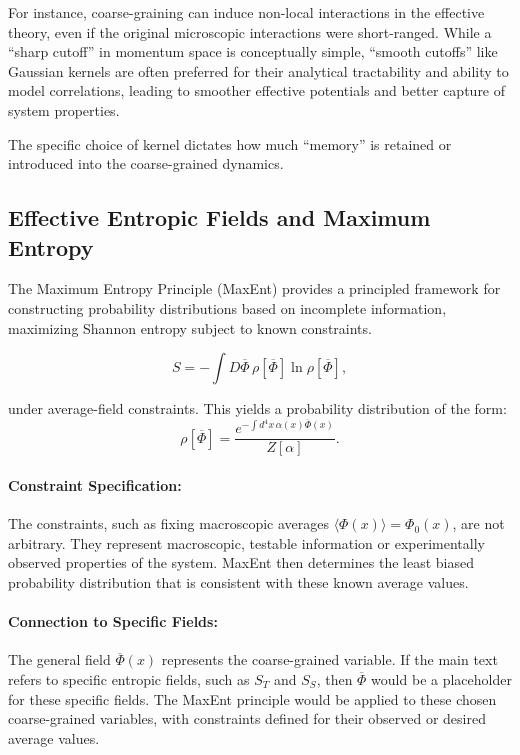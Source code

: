 \documentclass[12pt, a4paper]{article}
\begin{document}
For instance, coarse-graining can induce non-local interactions in the effective theory, even if the original microscopic interactions were short-ranged. While a ``sharp cutoff'' in momentum space is conceptually simple, ``smooth cutoffs'' like Gaussian kernels are often preferred for their analytical tractability and ability to model correlations,
leading to smoother effective potentials and better capture of system properties.

The specific choice of kernel dictates how much ``memory'' is retained or introduced into the coarse-grained dynamics.

\subsection{Effective Entropic Fields and Maximum Entropy}

The Maximum Entropy Principle (MaxEnt) provides a principled framework for constructing probability distributions based on incomplete information, maximizing Shannon entropy subject to known constraints.

\[
S = - \int D\overline{\Phi} \, \rho[\overline{\Phi}] \ln \rho[\overline{\Phi}],
\]

under average-field constraints. This yields a probability distribution of the form:
\[
\rho[\overline{\Phi}] = \frac{e^{-\int d^4 x \, \alpha(x) \overline{\Phi}(x)}}{Z[\alpha]}.
\]

\paragraph{Constraint Specification:}
The constraints, such as fixing macroscopic averages $\langle \Phi(x) \rangle = \Phi_0(x)$, are not arbitrary. They represent macroscopic, testable information or experimentally observed properties of the system. MaxEnt then determines the least biased probability distribution that is consistent with these known average values.

\paragraph{Connection to Specific Fields:}
The general field $\overline{\Phi}(x)$ represents the coarse-grained variable. If the main text refers to specific entropic fields, such as $S_T$ and $S_S$, then $\overline{\Phi}$ would be a placeholder for these specific fields. The MaxEnt principle would be applied to these chosen coarse-grained variables, with constraints defined for their observed or desired average values.
\end{document}
